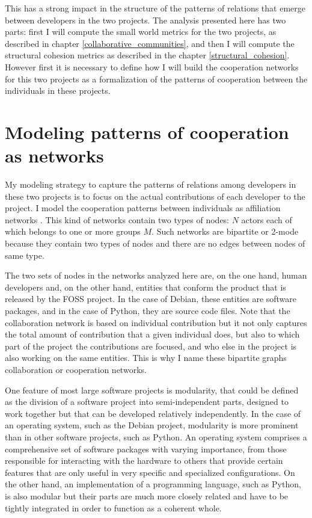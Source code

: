 This has a strong impact in the structure of the patterns of relations that emerge between developers in the two projects. The analysis presented here has two parts: first I will compute the small world metrics for the two projects, as described in chapter \ref{collaborative_communities}, and then I will compute the structural cohesion metrics as described in the chapter \ref{structural_cohesion}. However first it is necessary to define how I will build the cooperation networks for this two projects as a formalization of the patterns of cooperation between the individuals in these projects.

\section{Modeling patterns of cooperation as networks}

My modeling strategy to capture the patterns of relations among developers in these two projects is to focus on the actual contributions of each developer to the project. I model the cooperation patterns between individuals as affiliation networks \citep[chapter 8]{wasserman:1994}. This kind of networks contain two types of nodes: $N$ actors each of which belongs to one or more groups $M$. Such networks are bipartite or 2-mode because they contain two types of nodes and there are no edges between nodes of same type.

The two sets of nodes in the networks analyzed here are, on the one hand, human developers and, on the other hand, entities that conform the product that is released by the FOSS project. In the case of Debian, these entities are software packages, and in the case of Python, they are source code files. Note that the collaboration network is based on individual contribution but it not only captures the total amount of contribution that a given individual does, but also to which part of the project the contributions are focused, and who else in the project is also working on the same entities. This is why I name these bipartite graphs collaboration or cooperation networks.

One feature of most large software projects is modularity, that could be defined as the division of a software project into semi-independent parts, designed to work together but that can be developed relatively independently. In the case of an operating system, such as the Debian project, modularity is more prominent than in other software projects, such as Python. An operating system comprises a comprehensive set of software packages with varying importance, from those responsible for interacting with the hardware to others that provide certain features that are only useful in very specific and specialized configurations. On the other hand, an implementation of a programming language, such as Python, is also modular but their parts are much more closely related and have to be tightly integrated in order to function as a coherent whole.

